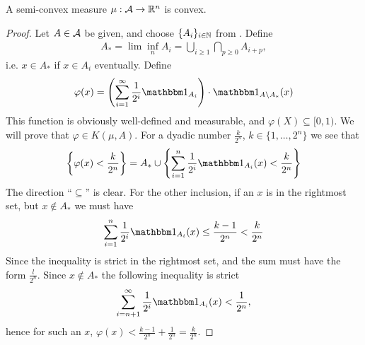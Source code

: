 \begin{lemma}\label{thm: semi-convex implies convex}
A semi-convex measure $\mu:\mathcal{A} \to \mathbb{R}^{n}$ is convex.
\end{lemma}
\begin{proof}
Let $A\in \mathcal{A}$ be given, and choose $\{A_{i}\}_{i\in \mathbb{N}}$ from .
Define
\begin{align*}
	A_{*}=\lim \inf_{n} A_{i} = \bigcup_{i\ge 1} \bigcap_{p\ge 0} A_{i+p},
\end{align*}
i.e. $x\in A_{*}$ if $x\in A_{i}$ eventually. Define
\begin{align*}
	\varphi(x)=\left( \sum_{i=1}^{\infty} \frac{1}{2^{i}}\ind{A_{i}} \right) \cdot \ind{A\setminus A_{*}}(x)
\end{align*}
This function is obviously well-defined and measurable, and $\varphi(X) \subseteq [0,1)$.
We will prove that $\varphi\in K(\mu, A)$. For a dyadic number $\frac{k}{2^{n}}$, $k\in \{1, \dots, 2^{n} \}$ we see that
\begin{align*}
	\left\{ \varphi(x) < \frac{k}{2^{n}} \right\} = A_{*} \cup \left\{ \sum_{i=1}^{n} \frac{1}{2^{i}}\ind{A_{i}}(x) < \frac{k}{2^{n}} \right\}
\end{align*}
The direction ``$\subseteq$'' is clear.
For the other inclusion, if an $x$ is in the rightmost set, but $x\not\in A_{*}$ we must have
\begin{align*}
	\sum_{i=1}^{n}\frac{1}{2^{i}}\ind{A_{i}}(x)\le \frac{k-1}{2^{n}}<\frac{k}{2^{n}}
\end{align*}
Since the inequality is strict in the rightmost set, and the sum must have the form $\frac{l}{2^{n}}$. Since $x\not\in A_{*}$ the following inequality is strict
\begin{align*}
	\sum_{i=n+1}^{\infty} \frac{1}{2^{i}}\ind{A_{i}}(x) < \frac{1}{2^{n}},
\end{align*}
hence for such an $x$, $\varphi(x) < \frac{k-1}{2^{n}}+\frac{1}{2^{n}}=\frac{k}{2^{n}}$.


\end{proof}
